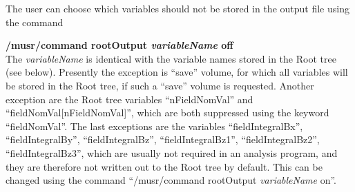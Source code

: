 \documentclass[twoside]{dis04}
\begin{document}
The user can choose which variables should not be stored in the output file using the command
\begin{description}
\item{\bf /musr/command rootOutput \emph{variableName} off} \\
	The \emph{variableName} is identical with the variable names stored in the Root tree
	(see below).  Presently the exception is ``save'' volume, for which all variables
	will be stored in the Root tree, if such a ``save'' volume is requested.
	Another exception are the Root tree variables ``nFieldNomVal'' and ``fieldNomVal[nFieldNomVal]'',
	which are both suppressed using the keyword ``fieldNomVal''.
	The last exceptions are the variables ``fieldIntegralBx'',
	``fieldIntegralBy'', ``fieldIntegralBz'', ``fieldIntegralBz1'', 
	``fieldIntegralBz2'', ``fieldIntegralBz3'', which are usually not required
	in an analysis program, and they are therefore not written out to the Root tree by default.  
	This can be changed using the command ``/musr/command rootOutput \emph{variableName} on''.
\end{description}
\end{document}
